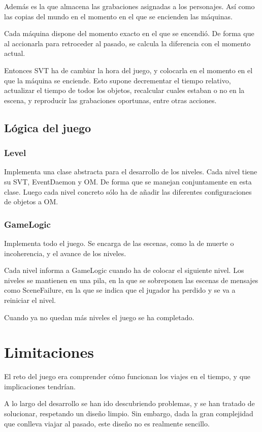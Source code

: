 \documentclass[11pt,a4paper]{article}
\begin{document}
Además es la que almacena las grabaciones asignadas a los personajes. Así como 
las copias del mundo en el momento en el que se encienden las máquinas.

Cada máquina dispone del momento exacto en el que se encendió. De forma que al 
accionarla para retroceder al pasado, se calcula la diferencia con el momento 
actual.

Entonces SVT ha de cambiar la hora del juego, y colocarla en el momento en el 
que la máquina se enciende. Esto supone decrementar el tiempo relativo, 
actualizar el tiempo de todos los objetos, recalcular cuales estaban o no en la 
escena, y reproducir las grabaciones oportunas, entre otras acciones.

\subsection{Lógica del juego}

\subsubsection{Level}
Implementa una clase abstracta para el desarrollo de los niveles. Cada nivel 
tiene su SVT, EventDaemon y OM. De forma que se manejan conjuntamente en esta 
clase. Luego cada nivel concreto sólo ha de añadir las diferentes 
configuraciones de objetos a OM.

\subsubsection{GameLogic}

Implementa todo el juego. Se encarga de las escenas, como la de muerte o 
incoherencia, y el avance de los niveles.

Cada nivel informa a GameLogic cuando ha de colocar el siguiente nivel. Los 
niveles se mantienen en una pila, en la que se sobreponen las escenas de 
mensajes como SceneFailure, en la que se indica que el jugador ha perdido y se 
va a reiniciar el nivel.

Cuando ya no quedan más niveles el juego se ha completado.

\section{Limitaciones}
El reto del juego era comprender cómo funcionan los viajes en el tiempo, y que 
implicaciones tendrían.

A lo largo del desarrollo se han ido descubriendo problemas, y se han tratado de 
solucionar, respetando un diseño limpio. Sin embargo, dada la gran complejidad 
que conlleva viajar al pasado, este diseño no es realmente sencillo.
\end{document}
